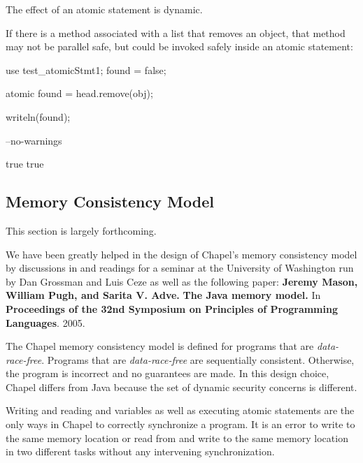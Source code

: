 The effect of an atomic statement is dynamic.

\begin{example}
If there is a method associated with a list that removes an object,
that method may not be parallel safe, but could be invoked safely inside an
atomic statement:
\begin{chapelpre}
use test\_atomicStmt1;
found = false;
\end{chapelpre}
\begin{chapel}
atomic found = head.remove(obj);
\end{chapel}
\begin{chapelpost}
writeln(found);
\end{chapelpost}
\begin{chapelcompopts}
--no-warnings
\end{chapelcompopts}
\begin{chapeloutput}
true
true
\end{chapeloutput}
\end{example}

\subsection{Memory Consistency Model}
\label{Memory_Consistency}

\begin{openissue}
This section is largely forthcoming.
\end{openissue}

We have been greatly helped in the design of Chapel's memory
consistency model by discussions in and readings for a seminar at the
University of Washington run by Dan Grossman and Luis Ceze as well as
the following paper: {\bf Jeremy Mason, William Pugh, and Sarita
V. Adve.}  {\bf The Java memory model.}  In {\bf Proceedings of the
32nd Symposium on Principles of Programming Languages}.  2005.

The Chapel memory consistency model is defined for programs that are
{\em data-race-free}.  Programs that are {\em data-race-free} are
sequentially consistent.  Otherwise, the program is incorrect and no
guarantees are made.  In this design choice, Chapel differs from Java
because the set of dynamic security concerns is different.

Writing and reading  and  variables as well as
executing atomic statements are the only ways in Chapel to correctly
synchronize a program.  It is an error to write to the same memory
location or read from and write to the same memory location in two
different tasks without any intervening synchronization.

